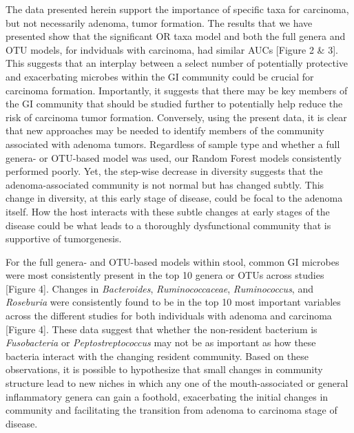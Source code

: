\documentclass[12pt,]{article}
\begin{document}
The data presented herein support the importance of specific taxa for
carcinoma, but not necessarily adenoma, tumor formation. The results
that we have presented show that the significant OR taxa model and both
the full genera and OTU models, for indviduals with carcinoma, had
similar AUCs {[}Figure 2 \& 3{]}. This suggests that an interplay
between a select number of potentially protective and exacerbating
microbes within the GI community could be crucial for carcinoma
formation. Importantly, it suggests that there may be key members of the
GI community that should be studied further to potentially help reduce
the risk of carcinoma tumor formation. Conversely, using the present
data, it is clear that new approaches may be needed to identify members
of the community associated with adenoma tumors. Regardless of sample
type and whether a full genera- or OTU-based model was used, our Random
Forest models consistently performed poorly. Yet, the step-wise decrease
in diversity suggests that the adenoma-associated community is not
normal but has changed subtly. This change in diversity, at this early
stage of disease, could be focal to the adenoma itself. How the host
interacts with these subtle changes at early stages of the disease could
be what leads to a thoroughly dysfunctional community that is supportive
of tumorgenesis.

For the full genera- and OTU-based models within stool, common GI
microbes were most consistently present in the top 10 genera or OTUs
across studies {[}Figure 4{]}. Changes in \emph{Bacteroides},
\emph{Ruminococcaceae}, \emph{Ruminococcus}, and \emph{Roseburia} were
consistently found to be in the top 10 most important variables across
the different studies for both individuals with adenoma and carcinoma
{[}Figure 4{]}. These data suggest that whether the non-resident
bacterium is \emph{Fusobacteria} or \emph{Peptostreptococcus} may not be
as important as how these bacteria interact with the changing resident
community. Based on these observations, it is possible to hypothesize
that small changes in community structure lead to new niches in which
any one of the mouth-associated or general inflammatory genera can gain
a foothold, exacerbating the initial changes in community and
facilitating the transition from adenoma to carcinoma stage of disease.
\end{document}
